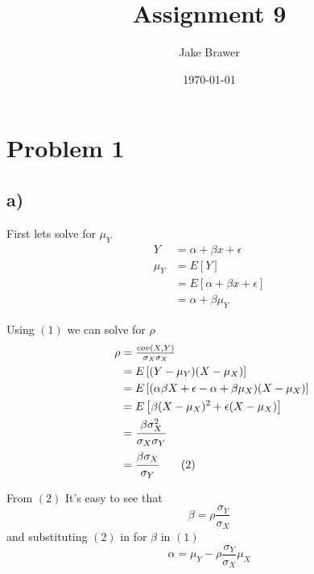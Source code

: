 \documentclass[11pt]{article}
\author{Jake Brawer}
\date{\today}
\title{Assignment 9}
\begin{document}
\maketitle


\section*{Problem 1}
\label{sec:org379b3f1}
\subsection*{a)}
\label{sec:org32a3391}
First lets solve for $\mu_{Y}$\\
\begin{align*}
  Y &= \alpha + \beta x + \epsilon\\
  \mu_{Y} &= E\left[Y \right]\\
    &= E\left[ \alpha + \beta x + \epsilon \right]\\
    &= \alpha + \beta \mu_{Y} \tag{1}
\end{align*}

Using $(1)$ we can solve for $\rho$\\
\begin{align*}

  \rho &= \tfrac{cov(X, Y)}{\sigma_{X} \sigma_{X}}\\

       \quad &= E \left[ (Y - \mu_{Y})(X - \mu_{X}) \right]\\

       \quad &= E \left[ (\alpha \beta X + \epsilon - \alpha + \beta \mu_{X} ) (X - \mu_{X})\right]\\

       \quad &= E \left[ \beta (X - \mu_{X})^{2} + \epsilon(X - \mu_{X}) \right]\\

       \quad &= \cfrac{\beta \sigma^{2}_{X}}{\sigma_{X} \sigma_{Y}} \\

  \quad &= \cfrac{\beta \sigma_{X}}{\sigma_{Y}} \tag{2}
\end{align*}

From $(2)$ It's easy to see that $$\beta =\rho \frac{\sigma_{Y}}{\sigma_{X}} $$
and substituting $(2)$ in for $\beta$ in  $(1)$ $$\alpha = \mu_{Y} - \rho
\frac{\sigma_{Y}}{\sigma_{X}} \mu_{X}$$
\end{document}
